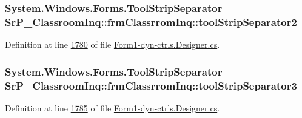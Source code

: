 \hypertarget{class_sr_p___classroom_inq_1_1frm_classrrom_inq_aa51d7952b4dde9caa9d7e111353a2047}{
\subsubsection[{tool\-Strip\-Separator2}]{\setlength{\rightskip}{0pt plus 5cm}\-System.\-Windows.\-Forms.\-Tool\-Strip\-Separator {\bf \-Sr\-P\-\_\-\-Classroom\-Inq\-::frm\-Classrrom\-Inq\-::tool\-Strip\-Separator2}}}
\label{class_sr_p___classroom_inq_1_1frm_classrrom_inq_aa51d7952b4dde9caa9d7e111353a2047}


\-Definition at line \hyperlink{_form1-dyn-ctrls_8_designer_8cs_source_l01780}{1780} of file \hyperlink{_form1-dyn-ctrls_8_designer_8cs_source}{\-Form1-\/dyn-\/ctrls.\-Designer.\-cs}.

\hypertarget{class_sr_p___classroom_inq_1_1frm_classrrom_inq_ac7f725652d980e8ef92f1119843f02a0}{
\subsubsection[{tool\-Strip\-Separator3}]{\setlength{\rightskip}{0pt plus 5cm}\-System.\-Windows.\-Forms.\-Tool\-Strip\-Separator {\bf \-Sr\-P\-\_\-\-Classroom\-Inq\-::frm\-Classrrom\-Inq\-::tool\-Strip\-Separator3}}}
\label{class_sr_p___classroom_inq_1_1frm_classrrom_inq_ac7f725652d980e8ef92f1119843f02a0}


\-Definition at line \hyperlink{_form1-dyn-ctrls_8_designer_8cs_source_l01785}{1785} of file \hyperlink{_form1-dyn-ctrls_8_designer_8cs_source}{\-Form1-\/dyn-\/ctrls.\-Designer.\-cs}.

